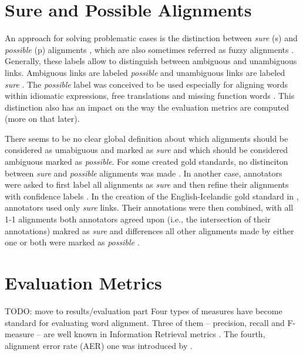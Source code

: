 \section{Sure and Possible Alignments}
\label{sec:sure_possible}
An approach for solving problematic cases is the distinction between \emph{sure} (s) and \emph{possible} (p) alignments \autocite{och-ney-2000-improved}, which are also sometimes referred as fuzzy alignments \autocite{clematide2018}. 
Generally, these labels allow to distinguish between ambiguous and unambiguous links. 
Ambiguous links are labeled \emph{possible} and unambiguous links are labeled \emph{sure} \autocite{lambert2005}. 
The \emph{possible} label was conceived to be used especially for aligning words within idiomatic expressions, free translations and missing function words \autocite{och-ney-2000-improved}.
This distinction also has an impact on the way the evaluation metrics are computed (more on that later).

There seems to be no clear global definition about which alignments should be considered as umabiguous and marked as \emph{sure} and which should be considered ambiguous marked as \emph{possible}. 
For some created gold standards, no distinciton between \emph{sure} and \emph{possible} alignments was made \autocite{clematide2018}. 
In another case, annotators were asked to first label all alignments as \emph{sure} and then refine their alignments with confidence labels \autocite{holmqvist-ahrenberg-2011-gold}. 
In the creation of the English-Icelandic gold standard in \cite{steingrimsson-etal-2021-combalign},  annotators used only \emph{sure} links. 
Their annotations were then combined, with all 1-1 alignments both annotators agreed upon (i.e., the intersection of their annotations) makred as \emph{sure} and differences all other alignments made by either one or both were marked as \emph{possible} \autocite{steingrimsson-etal-2021-combalign}. 

\section{Evaluation Metrics}
TODO: move to results/evaluation part
Four types of measures have become standard for evaluating word alignment. Three of them -- precision, recall and F-measure -- are well known in Information Retrieval metrics \cite{mihalcea-pedersen-2003-evaluation}. 
The fourth, alignment error rate (AER) one was introduced by \cite{och-ney-2000-improved}.

